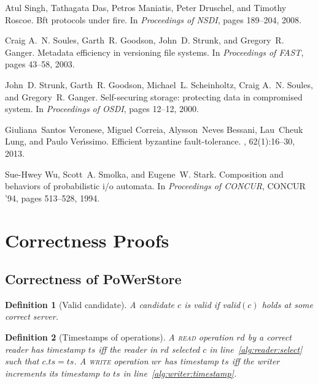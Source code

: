 \documentclass[10pt,conference,compsocconf]{IEEEtran}
\newcommand{\protocol}{PoWerStore}
\newtheorem{defn}{Definition}[section]
\begin{document}
\begin{thebibliography}{10}
Atul Singh, Tathagata Das, Petros Maniatis, Peter Druschel, and Timothy Roscoe.
\newblock Bft protocols under fire.
\newblock In {\em Proceedings of NSDI}, pages 189--204, 2008.

Craig A.~N. Soules, Garth~R. Goodson, John~D. Strunk, and Gregory~R. Ganger.
\newblock Metadata efficiency in versioning file systems.
\newblock In {\em Proceedings of FAST}, pages 43--58, 2003.

John~D. Strunk, Garth~R. Goodson, Michael~L. Scheinholtz, Craig A.~N. Soules,
  and Gregory~R. Ganger.
\newblock Self-securing storage: protecting data in compromised system.
\newblock In {\em Proceedings of OSDI}, pages 12--12, 2000.

Giuliana~Santos Veronese, Miguel Correia, Alysson~Neves Bessani, Lau~Cheuk
  Lung, and Paulo Ver\'{\i}ssimo.
\newblock Efficient byzantine fault-tolerance.
, 62(1):16--30, 2013.

Sue-Hwey Wu, Scott~A. Smolka, and Eugene~W. Stark.
\newblock Composition and behaviors of probabilistic i/o automata.
\newblock In {\em Proceedings of CONCUR}, CONCUR '94, pages 513--528, 1994.

\end{thebibliography}


\newpage

\appendix

\section{Correctness Proofs}
\subsection{Correctness of \protocol}

\begin{defn}[Valid candidate] \label{def:validcand}
A candidate $c$ is \emph{valid} if \emph{\textsf{valid}}$(c)$ holds at some correct server.
\end{defn}


\begin{defn}[Timestamps of operations]
A \textsc{read} operation $rd$ by a correct reader has timestamp $ts$ iff the reader in $rd$ selected $c$
in line~\ref{alg:reader:select} such that $c.ts = ts$. A \textsc{write} operation $wr$ has timestamp $ts$ iff
the writer increments its timestamp to $ts$ in line~\ref{alg:writer:timestamp}.
\end{defn}
\end{document}
